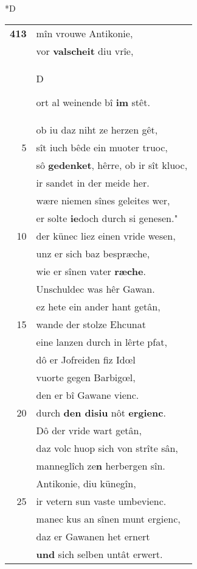 \documentclass[8pt,a4paper,notitlepage]{article}
\begin{document}
\begin{table}[ht]
\begin{minipage}[t]{0.5\linewidth}
\small
\begin{center}*D
\end{center}
\begin{tabular}{rl}
\textbf{413} & mîn vrouwe Antikonie,\\ 
 & vor \textbf{valscheit} diu vrîe,\\ 
 & \begin{large}D\end{large}ort al weinende bî \textbf{im} stêt.\\ 
 & ob iu daz niht ze herzen gêt,\\ 
5 & sît iuch bêde ein muoter truoc,\\ 
 & sô \textbf{gedenket}, hêrre, ob ir sît kluoc,\\ 
 & ir sandet in der meide her.\\ 
 & wære niemen sînes geleites wer,\\ 
 & er solte \textbf{ie}doch durch si genesen."\\ 
10 & der künec liez einen vride wesen,\\ 
 & unz er sich baz bespræche,\\ 
 & wie er sînen vater \textbf{ræche}.\\ 
 & Unschuldec was hêr Gawan.\\ 
 & ez hete ein ander hant getân,\\ 
15 & wande der stolze Ehcunat\\ 
 & eine lanzen durch in lêrte pfat,\\ 
 & dô er Jofreiden fiz Idœl\\ 
 & vuorte gegen Barbigœl,\\ 
 & den er bî Gawane vienc.\\ 
20 & durch \textbf{den disiu} nôt \textbf{ergienc}.\\ 
 & Dô der vride wart getân,\\ 
 & daz volc huop sich von strîte sân,\\ 
 & manneglîch ze\textbf{n} herbergen sîn.\\ 
 & Antikonie, diu künegîn,\\ 
25 & ir vetern sun vaste umbevienc.\\ 
 & manec kus an sînen munt ergienc,\\ 
 & daz er Gawanen het ernert\\ 
 & \textbf{und} sich selben untât erwert.\\ 

\end{tabular}
\end{minipage}
\end{table}
\end{document}
